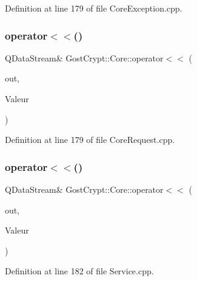 Definition at line 179 of file Core\+Exception.\+cpp.

\mbox{\label{namespace_gost_crypt_1_1_core_a853e8e6d522159a7176b1a7066a0fe07}} 
\subsubsection{\texorpdfstring{operator$<$$<$()}{operator<<()}\hspace{0.1cm}{\footnotesize\ttfamily [31/56]}}
{\footnotesize\ttfamily Q\+Data\+Stream\& Gost\+Crypt\+::\+Core\+::operator$<$$<$ (\begin{DoxyParamCaption}\item[{Q\+Data\+Stream \&}]{out,  }\item[{const \hyperlink{struct_gost_crypt_1_1_core_1_1_dismount_volume_request}{Dismount\+Volume\+Request} \&}]{Valeur }\end{DoxyParamCaption})}



Definition at line 179 of file Core\+Request.\+cpp.

\mbox{\label{namespace_gost_crypt_1_1_core_ac48b27037ce0618b76cdc05d85840819}} 
\subsubsection{\texorpdfstring{operator$<$$<$()}{operator<<()}\hspace{0.1cm}{\footnotesize\ttfamily [32/56]}}
{\footnotesize\ttfamily Q\+Data\+Stream\& Gost\+Crypt\+::\+Core\+::operator$<$$<$ (\begin{DoxyParamCaption}\item[{Q\+Data\+Stream \&}]{out,  }\item[{const \hyperlink{struct_gost_crypt_1_1_core_1_1_exception_response}{Exception\+Response} \&}]{Valeur }\end{DoxyParamCaption})}



Definition at line 182 of file Service.\+cpp.

